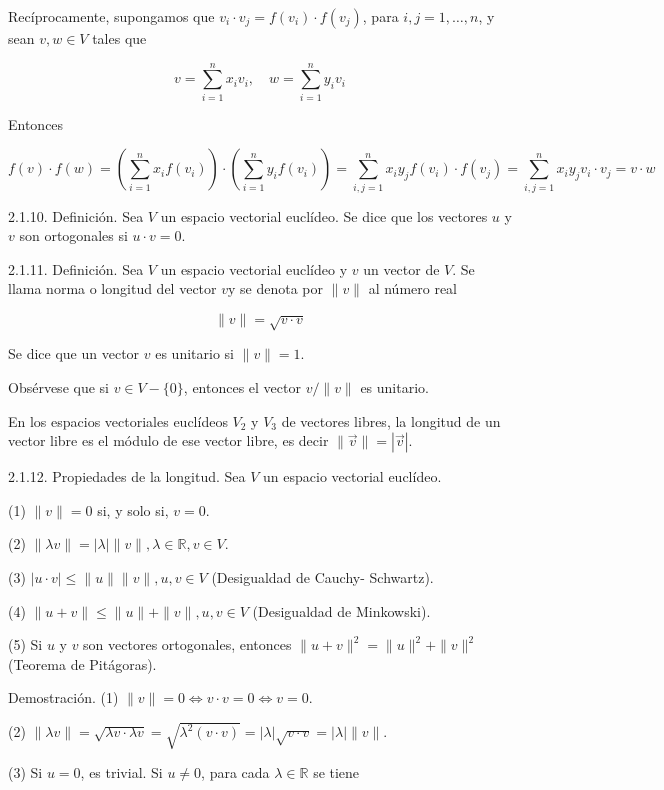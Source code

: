 \documentclass[12pt, a4paper, ones, notitlepage, openany,titlepage]{article}
\begin{document}
Recíprocamente, supongamos que $v_{i} \cdot v_{j}=f\left(v_{i}\right) \cdot f\left(v_{j}\right)$, para $i, j=1, \ldots, n$, y sean $v, w \in V$ tales que

$$
v=\sum_{i=1}^{n} x_{i} v_{i}, \quad w=\sum_{i=1}^{n} y_{i} v_{i}
$$

Entonces

$$
f(v) \cdot f(w)=\left(\sum_{i=1}^{n} x_{i} f\left(v_{i}\right)\right) \cdot\left(\sum_{i=1}^{n} y_{i} f\left(v_{i}\right)\right)=\sum_{i, j=1}^{n} x_{i} y_{j} f\left(v_{i}\right) \cdot f\left(v_{j}\right)=\sum_{i, j=1}^{n} x_{i} y_{j} v_{i} \cdot v_{j}=v \cdot w
$$

2.1.10. Definición. Sea $V$ un espacio vectorial euclídeo. Se dice que los vectores $u$ y $v$ son ortogonales si $u \cdot v=0$.

2.1.11. Definición. Sea $V$ un espacio vectorial euclídeo y $v$ un vector de $V$. Se llama norma o longitud del vector $v \mathrm{y}$ se denota por $\|v\|$ al número real

$$
\|v\|=\sqrt{v \cdot v}
$$

Se dice que un vector $v$ es unitario si $\|v\|=1$.

Obsérvese que si $v \in V-\{0\}$, entonces el vector $v /\|v\|$ es unitario.

En los espacios vectoriales euclídeos $V_{2}$ y $V_{3}$ de vectores libres, la longitud de un vector libre es el módulo de ese vector libre, es decir $\|\vec{v}\|=|\vec{v}|$.

2.1.12. Propiedades de la longitud. Sea $V$ un espacio vectorial euclídeo.

(1) $\|v\|=0$ si, y solo si, $v=0$.

(2) $\|\lambda v\|=|\lambda|\|v\|, \lambda \in \mathbb{R}, v \in V$.

(3) $|u \cdot v| \leq\|u\|\|v\|, u, v \in V$ (Desigualdad de Cauchy- Schwartz).

(4) $\|u+v\| \leq\|u\|+\|v\|, u, v \in V$ (Desigualdad de Minkowski).

(5) Si $u$ y $v$ son vectores ortogonales, entonces $\|u+v\|^{2}=\|u\|^{2}+\|v\|^{2}$ (Teorema de Pitágoras).

Demostración. (1) $\|v\|=0 \Longleftrightarrow v \cdot v=0 \Longleftrightarrow v=0$.

(2) $\|\lambda v\|=\sqrt{\lambda v \cdot \lambda v}=\sqrt{\lambda^{2}(v \cdot v)}=|\lambda| \sqrt{v \cdot v}=|\lambda|\|v\|$.

(3) Si $u=0$, es trivial. Si $u \neq 0$, para cada $\lambda \in \mathbb{R}$ se tiene
\end{document}
